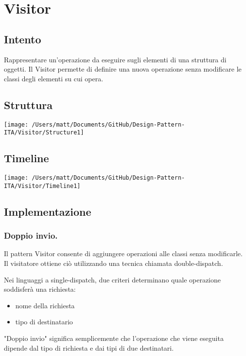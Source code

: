 \chapter{Visitor}
\section{Intento}

Rappresentare un'operazione da eseguire sugli elementi di una struttura di oggetti. Il Visitor permette di definire una nuova operazione senza modificare le classi degli elementi su cui opera.


\section{Struttura}

\texttt{[image: /Users/matt/Documents/GitHub/Design-Pattern-ITA/Visitor/Structure1]}


\section{Timeline}

\texttt{[image: /Users/matt/Documents/GitHub/Design-Pattern-ITA/Visitor/Timeline1]}


\section{Implementazione}

\subsection{Doppio invio.} 
Il pattern Visitor consente di aggiungere operazioni alle classi senza modificarle. Il visitatore ottiene ciò utilizzando una tecnica chiamata double-dispatch.

Nei linguaggi a single-dispatch, due criteri determinano quale operazione soddisferà una richiesta:

\begin{itemize}
    \item nome della richiesta
    \item tipo di destinatario
\end{itemize}

"Doppio invio" significa semplicemente che l'operazione che viene eseguita dipende dal tipo di richiesta e dai tipi di due destinatari.

